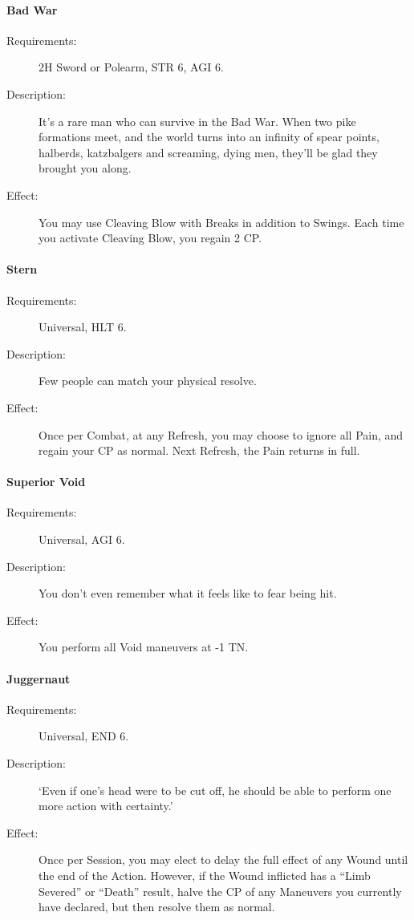 \documentclass[oneside,11pt,english]{book}
\begin{document}
\paragraph{\label{talent:Bad War}Bad War}
	\begin{description}
		\item [Requirements:] 2H Sword or Polearm, STR 6, AGI 6. 
		\item [Description:] It’s a rare man who can survive in the Bad War. When two pike formations meet, and the world turns into an infinity of spear points, halberds, katzbalgers and screaming, dying men, they’ll be glad they brought you along. 
		\item [Effect:] You may use Cleaving Blow with Breaks in addition to Swings. Each time you activate Cleaving Blow, you regain 2 CP. 

	\end{description}
\paragraph{\label{talent:Stern}Stern}
	\begin{description}
		\item [Requirements:] Universal, HLT 6. 
		\item [Description:] Few people can match your physical resolve. 
		\item [Effect:] Once per Combat, at any Refresh, you may choose to ignore all Pain, and regain your CP as normal. Next Refresh, the Pain returns in full. 

	\end{description}
\paragraph{\label{talent:Superior Void}Superior Void}
	\begin{description}
		\item [Requirements:] Universal, AGI 6. 
		\item [Description:] You don’t even remember what it feels like to fear being hit. 
		\item [Effect:] You perform all Void maneuvers at -1 TN. 

	\end{description}
\paragraph{\label{talent:Juggernaut}Juggernaut}
	\begin{description}
		\item [Requirements:] Universal, END 6. 
		\item [Description:] ‘Even if one’s head were to be cut off, he should be able to perform one more action with certainty.’ 
		\item [Effect:] Once per Session, you may elect to delay the full effect of any Wound until the end of the Action. 
However, if the Wound inflicted has a “Limb Severed” or “Death” result, halve the CP of any Maneuvers 
you currently have declared, but then resolve them as normal. 

	\end{description}
\end{document}
